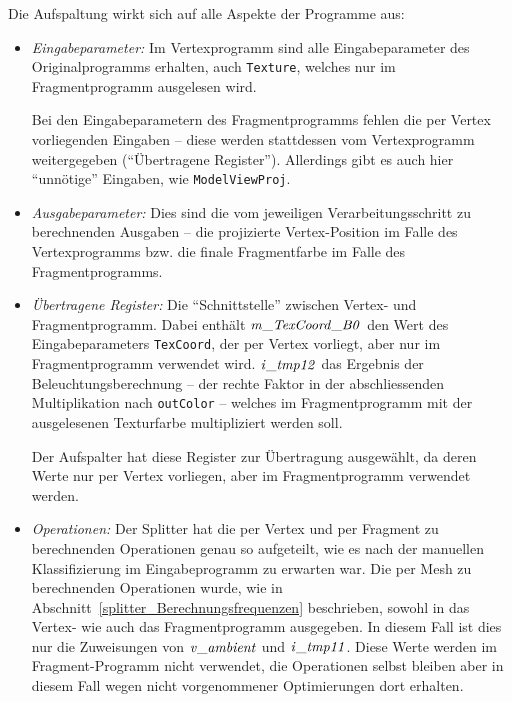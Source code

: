 \documentclass[twoside,a4paper,fleqn,12pt]{book}
\begin{document}
Die Aufspaltung wirkt sich auf alle Aspekte der Programme aus:
\begin{itemize}
\item \emph{Eingabeparameter:} Im Vertexprogramm sind alle Eingabeparameter des Originalprogramms erhalten,
auch \texttt{Texture}, welches nur im Fragmentprogramm ausgelesen wird.

Bei den Eingabeparametern des Fragmentprogramms fehlen die per Vertex vorliegenden Eingaben -- diese werden
stattdessen vom Vertexprogramm weitergegeben ("`Übertragene Register"'). Allerdings gibt es auch
hier "`unnötige"' Eingaben, wie \texttt{ModelViewProj}. 

\item \emph{Ausgabeparameter:} Dies sind die vom jeweiligen Verarbeitungsschritt zu berechnenden Ausgaben --
die projizierte Vertex-Position im Falle des Vertexprogramms bzw. die finale Fragmentfarbe im Falle des
Fragmentprogramms.

\item \emph{Übertragene Register:} Die "`Schnittstelle"' zwischen Vertex- und Fragmentprogramm.
Dabei enthält $\mathit{m\_TexCoord\_B0}$ den Wert des Eingabeparameters \texttt{TexCoord}, der per Vertex vorliegt,
aber nur im Fragmentprogramm verwendet wird. $\mathit{i\_tmp12}$ das Ergebnis der Beleuchtungsberechnung
-- der rechte Faktor in der abschliessenden Multiplikation nach \texttt{outColor} --
welches im Fragmentprogramm mit der ausgelesenen Texturfarbe multipliziert werden soll.

Der Aufspalter hat diese Register zur Übertragung ausgewählt, da deren Werte nur per Vertex vorliegen,
aber im Fragmentprogramm verwendet werden.

\item \emph{Operationen:} Der Splitter hat die per Vertex und per Fragment zu berechnenden Operationen
genau so aufgeteilt, wie es nach der manuellen Klassifizierung im Eingabeprogramm zu erwarten war.
Die per Mesh zu berechnenden Operationen wurde, wie in Abschnitt~\ref{splitter_Berechnungsfrequenzen}
beschrieben, sowohl in das Vertex- wie auch das Fragmentprogramm ausgegeben. In diesem Fall ist dies
nur die Zuweisungen von $\mathit{v\_ambient}$ und $\mathit{i\_tmp11}$. Diese Werte werden im Fragment-Programm nicht verwendet,
die Operationen selbst bleiben aber in diesem Fall wegen nicht vorgenommener Optimierungen dort erhalten.

\end{itemize}
\end{document}
